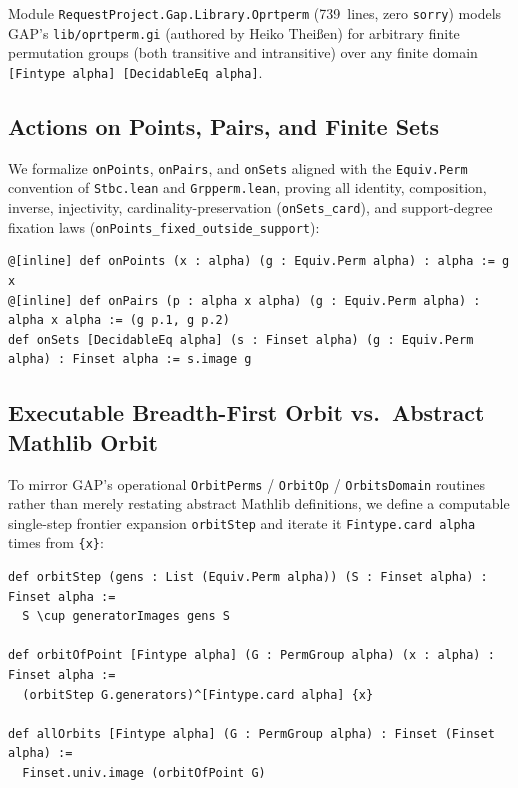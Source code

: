 \documentclass[11pt,a4paper]{article}
\begin{document}
Module \texttt{RequestProject.\allowbreak Gap.Library.\allowbreak Oprtperm} (739~lines, zero \texttt{sorry}) models GAP's \texttt{lib/oprtperm.gi} (authored by Heiko Thei\ss en) for arbitrary finite permutation groups (both transitive and intransitive) over any finite domain \texttt{[Fintype alpha] [DecidableEq alpha]}.

\subsection{Actions on Points, Pairs, and Finite Sets}
We formalize \texttt{onPoints}, \texttt{onPairs}, and \texttt{onSets} aligned with the \texttt{Equiv.Perm} convention of \texttt{Stbc.lean} and \texttt{Grpperm.lean}, proving all identity, composition, inverse, injectivity, cardinality-preservation (\texttt{onSets\_card}), and support-degree fixation laws (\texttt{onPoints\_\allowbreak fixed\_\allowbreak outside\_\allowbreak support}):

\begin{lstlisting}[language=Lean4]
@[inline] def onPoints (x : alpha) (g : Equiv.Perm alpha) : alpha := g x
@[inline] def onPairs (p : alpha x alpha) (g : Equiv.Perm alpha) : alpha x alpha := (g p.1, g p.2)
def onSets [DecidableEq alpha] (s : Finset alpha) (g : Equiv.Perm alpha) : Finset alpha := s.image g
\end{lstlisting}

\subsection{Executable Breadth-First Orbit vs.\ Abstract Mathlib Orbit}
To mirror GAP's operational \texttt{OrbitPerms} / \texttt{OrbitOp} / \texttt{OrbitsDomain} routines rather than merely restating abstract Mathlib definitions, we define a computable single-step frontier expansion \texttt{orbitStep} and iterate it \texttt{Fintype.card alpha} times from \texttt{\{x\}}:

\begin{lstlisting}[language=Lean4]
def orbitStep (gens : List (Equiv.Perm alpha)) (S : Finset alpha) : Finset alpha :=
  S \cup generatorImages gens S

def orbitOfPoint [Fintype alpha] (G : PermGroup alpha) (x : alpha) : Finset alpha :=
  (orbitStep G.generators)^[Fintype.card alpha] {x}

def allOrbits [Fintype alpha] (G : PermGroup alpha) : Finset (Finset alpha) :=
  Finset.univ.image (orbitOfPoint G)
\end{lstlisting}
\end{document}
